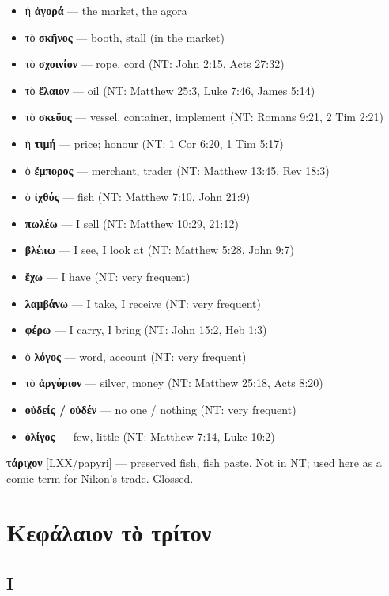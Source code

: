 \documentclass[a4paper]{report}
\begin{document}
\begin{itemize}
\tightlist
\item
  ἡ \textbf{ἀγορά} --- the market, the agora
\item
  τὸ \textbf{σκῆνος} --- booth, stall (in the market)
\item
  τὸ \textbf{σχοινίον} --- rope, cord (NT: John 2:15, Acts 27:32)
\item
  τὸ \textbf{ἔλαιον} --- oil (NT: Matthew 25:3, Luke 7:46, James 5:14)
\item
  τὸ \textbf{σκεῦος} --- vessel, container, implement (NT: Romans 9:21,
  2 Tim 2:21)
\item
  ἡ \textbf{τιμή} --- price; honour (NT: 1 Cor 6:20, 1 Tim 5:17)
\item
  ὁ \textbf{ἔμπορος} --- merchant, trader (NT: Matthew 13:45, Rev 18:3)
\item
  ὁ \textbf{ἰχθύς} --- fish (NT: Matthew 7:10, John 21:9)
\item
  \textbf{πωλέω} --- I sell (NT: Matthew 10:29, 21:12)
\item
  \textbf{βλέπω} --- I see, I look at (NT: Matthew 5:28, John 9:7)
\item
  \textbf{ἔχω} --- I have (NT: very frequent)
\item
  \textbf{λαμβάνω} --- I take, I receive (NT: very frequent)
\item
  \textbf{φέρω} --- I carry, I bring (NT: John 15:2, Heb 1:3)
\item
  ὁ \textbf{λόγος} --- word, account (NT: very frequent)
\item
  τὸ \textbf{ἀργύριον} --- silver, money (NT: Matthew 25:18, Acts 8:20)
\item
  \textbf{οὐδείς / οὐδέν} --- no one / nothing (NT: very frequent)
\item
  \textbf{ὀλίγος} --- few, little (NT: Matthew 7:14, Luke 10:2)
\end{itemize}

\textbf{τάριχον} {[}LXX/papyri{]} --- preserved fish, fish paste. Not in
NT; used here as a comic term for Nikon's trade. Glossed.

\section{Κεφάλαιον τὸ
τρίτον}\label{ux3baux3b5ux3c6ux3acux3bbux3b1ux3b9ux3bfux3bd-ux3c4ux1f78-ux3c4ux3c1ux3afux3c4ux3bfux3bd}

\subsection{Ι}\label{ux3b9-2}
\end{document}
